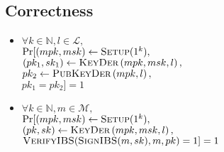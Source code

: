   \subsection{Correctness}
    \begin{itemize}
      \item $\forall k \in \mathbb{N}, l \in \mathcal{L},$ \\
      $\Pr[(mpk, msk) \gets \textsc{Setup}(1^k),$ \\
      $(pk_1, sk_1) \gets \textsc{KeyDer}\left(mpk, msk, l\right),$ \\
      $pk_2 \gets \textsc{PubKeyDer}\left(mpk, l\right),$ \\
      $pk_1 = pk_2] = 1$

      \item $\forall k \in \mathbb{N}, m \in \mathcal{M},$ \\
      $\Pr[(mpk, msk) \gets \textsc{Setup}(1^k),$ \\
      $(pk, sk) \gets \textsc{KeyDer}\left(mpk, msk, l\right),$ \\
      $\textsc{VerifyIBS}(\textsc{SignIBS}(m, sk), m, pk) = 1] = 1$
    \end{itemize}


